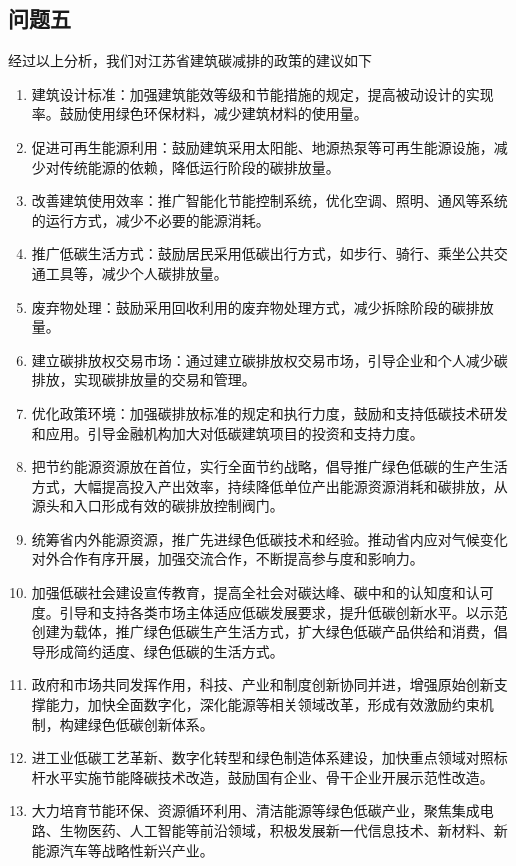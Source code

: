 \documentclass[a4paper, 12pt]{article}
\numberwithin{equation}{section}
\begin{document}
        \subsection{问题五}
            经过以上分析，我们对江苏省建筑碳减排的政策的建议如下
            \begin{enumerate}[(1)]
                \item 建筑设计标准：加强建筑能效等级和节能措施的规定，提高被动设计的实现率。鼓励使用绿色环保材料，减少建筑材料的使用量。
                \item 促进可再生能源利用：鼓励建筑采用太阳能、地源热泵等可再生能源设施，减少对传统能源的依赖，降低运行阶段的碳排放量。
                \item 改善建筑使用效率：推广智能化节能控制系统，优化空调、照明、通风等系统的运行方式，减少不必要的能源消耗。
                \item 推广低碳生活方式：鼓励居民采用低碳出行方式，如步行、骑行、乘坐公共交通工具等，减少个人碳排放量。
                \item 废弃物处理：鼓励采用回收利用的废弃物处理方式，减少拆除阶段的碳排放量。
                \item 建立碳排放权交易市场：通过建立碳排放权交易市场，引导企业和个人减少碳排放，实现碳排放量的交易和管理。
                \item 优化政策环境：加强碳排放标准的规定和执行力度，鼓励和支持低碳技术研发和应用。引导金融机构加大对低碳建筑项目的投资和支持力度。
                \item 把节约能源资源放在首位，实行全面节约战略，倡导推广绿色低碳的生产生活方式，大幅提高投入产出效率，持续降低单位产出能源资源消耗和碳排放，从源头和入口形成有效的碳排放控制阀门。
                \item 统筹省内外能源资源，推广先进绿色低碳技术和经验。推动省内应对气候变化对外合作有序开展，加强交流合作，不断提高参与度和影响力。
                \item 加强低碳社会建设宣传教育，提高全社会对碳达峰、碳中和的认知度和认可度。引导和支持各类市场主体适应低碳发展要求，提升低碳创新水平。以示范创建为载体，推广绿色低碳生产生活方式，扩大绿色低碳产品供给和消费，倡导形成简约适度、绿色低碳的生活方式。
                \item 政府和市场共同发挥作用，科技、产业和制度创新协同并进，增强原始创新支撑能力，加快全面数字化，深化能源等相关领域改革，形成有效激励约束机制，构建绿色低碳创新体系。
                \item 进工业低碳工艺革新、数字化转型和绿色制造体系建设，加快重点领域对照标杆水平实施节能降碳技术改造，鼓励国有企业、骨干企业开展示范性改造。
                \item 大力培育节能环保、资源循环利用、清洁能源等绿色低碳产业，聚焦集成电路、生物医药、人工智能等前沿领域，积极发展新一代信息技术、新材料、新能源汽车等战略性新兴产业。
            \end{enumerate}
\end{document}
